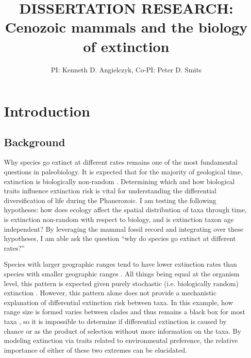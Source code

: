 \documentclass[11pt,letterpaper]{article}
\title{\uppercase{Dissertation Research:}\\ Cenozoic mammals and the biology of extinction}
\author{PI: Kenneth D. Angielczyk, Co-PI: Peter D. Smits}
\date{}
\begin{document}
\linenumbers
\modulolinenumbers[2]

\setcounter{secnumdepth}{0}

\maketitle


\section{Introduction}
\subsection{Background}
Why species go extinct at different rates remains one of the most fundamental questions in paleobiology. It is expected that for the majority of geological time, extinction is biologically non-random \citep{Jablonski1986,Alexander1977,Harnik2011,Johnson2002b,Kitchell1986,Nurnberg2013a,Payne2007}. Determining which and how biological traits influence extinction risk is vital for understanding the differential diversification of life during the Phanerozoic. I am testing the following hypotheses: how does ecology affect the spatial distribution of taxa through time, is extinction non-random with respect to biology, and is extinction taxon age independent? By leveraging the mammal fossil record and integrating over these hypotheses, I am able ask the question ``why do species go extinct at different rates?''

Species with larger geographic ranges tend to have lower extinction rates than species with smaller geographic ranges \citep{Jablonski1986,Harnik2013,Nurnberg2013a,Jablonski2003,Roy2009c}. All things being equal at the organism level, this pattern is expected given purely stochastic (i.e. biologically random) extinction \citep{Raup1991b}. However, this pattern alone does not provide a mechanistic explanation of differential extinction risk between taxa. In this example, how range size is formed varies between clades and thus remains a black box for most taxa \citep{Jablonski1987}, so it is impossible to determine if differential extinction is caused by chance or as the product of selection without more information on the taxa. By modeling extinction via traits related to environmental preference, the relative importance of either of these two extremes can be elucidated.
\end{document}
